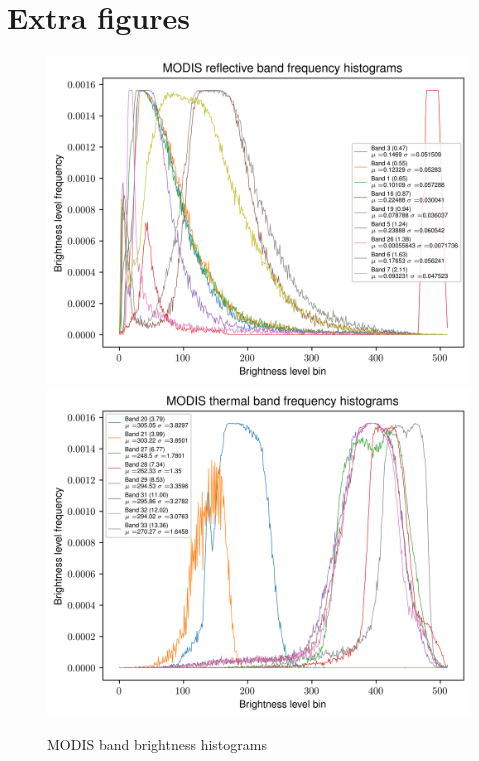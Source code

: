 \documentclass[12pt]{article}
\begin{document}
\clearpage

\section{Extra figures}

\begin{figure}[h!]
    \centering
    \includegraphics[width=.8\textwidth]{figures/hists_ref.png}
    \includegraphics[width=.8\textwidth]{figures/hists_tb.png}
    \caption{MODIS band brightness histograms}
    \label{}
\end{figure}
\end{document}
